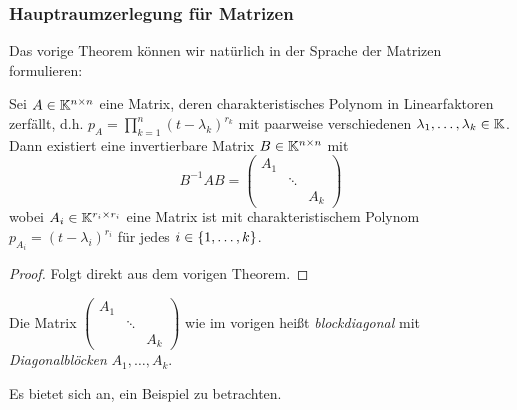 \subsubsection{Hauptraumzerlegung für Matrizen}

Das vorige Theorem können wir natürlich in der Sprache der Matrizen formulieren:

\begin{thm}
	Sei $ A \in \mathbb K^{n \times n} $ eine Matrix, deren charakteristisches Polynom in Linearfaktoren zerfällt, d.h. $ p_A = \prod_{k=1}^{n} (t - \lambda_k)^{r_k} $ mit paarweise verschiedenen $ \lambda_1, \ldots, \lambda_k \in \mathbb K $. Dann existiert eine invertierbare Matrix $ B \in \mathbb K^{n \times n} $ mit
	\begin{equation*}
		B^{-1}AB = \begin{pmatrix}
			A_1 && \\
			& \ddots & \\
			&& A_k
		\end{pmatrix}
	\end{equation*}
	wobei $ A_i \in \mathbb K^{r_i \times r_i} $ eine Matrix ist mit charakteristischem Polynom $ p_{A_i} = (t-\lambda_i)^{r_i} $ für jedes $ i \in \{ 1,\ldots,k \} $.
\end{thm}
\begin{proof}
	Folgt direkt aus dem vorigen Theorem.
\end{proof}

\noindent Die Matrix $ \begin{pmatrix}
A_1 && \\
& \ddots & \\
&& A_k
\end{pmatrix} $ wie im vorigen heißt \emph{blockdiagonal} mit \emph{Diagonalblöcken} $ A_1, \ldots, A_k $.


Es bietet sich an, ein Beispiel zu betrachten. 


